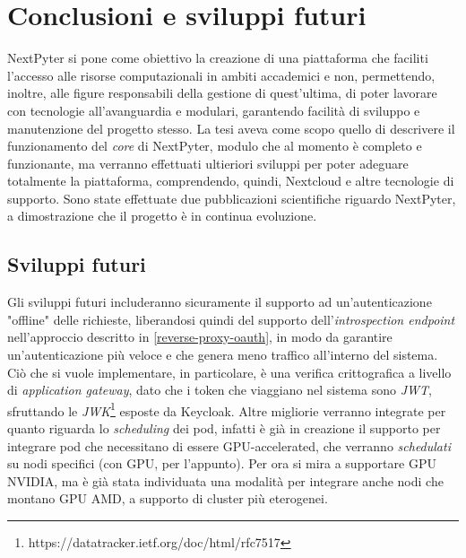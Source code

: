 \chapter{Conclusioni e sviluppi futuri}
NextPyter si pone come obiettivo la creazione di una piattaforma che faciliti l'accesso alle risorse computazionali in ambiti accademici e non, permettendo, inoltre, alle figure responsabili della gestione di quest'ultima, di poter lavorare con tecnologie all'avanguardia e modulari, garantendo facilità di sviluppo e manutenzione del progetto stesso.
\newline
La tesi aveva come scopo quello di descrivere il funzionamento del \textit{core} di NextPyter, modulo che al momento è completo e funzionante, ma verranno effettuati ultieriori sviluppi per poter adeguare totalmente la piattaforma, comprendendo, quindi, Nextcloud e altre tecnologie di supporto.
\newline
Sono state effettuate due pubblicazioni scientifiche\cite{nextpyter-work-1}\cite{nextpyter-work-2} riguardo NextPyter, a dimostrazione che il progetto è in continua evoluzione.

\section{Sviluppi futuri}
Gli sviluppi futuri includeranno sicuramente il supporto ad un'autenticazione "offline" delle richieste, liberandosi quindi del supporto dell'\textit{introspection endpoint} nell'approccio descritto in \ref{reverse-proxy-oauth}, in modo da garantire un'autenticazione più veloce e che genera meno traffico all'interno del sistema. Ciò che si vuole implementare, in particolare, è una verifica crittografica a livello di \textit{application gateway}, dato che i token che viaggiano nel sistema sono \textit{JWT}, sfruttando le \textit{JWK}\footnote{https://datatracker.ietf.org/doc/html/rfc7517} esposte da Keycloak.
\newline
Altre migliorie verranno integrate per quanto riguarda lo \textit{scheduling} dei pod, infatti è già in creazione il supporto per integrare pod che necessitano di essere GPU-accelerated, che verranno \textit{schedulati} su nodi specifici (con GPU, per l'appunto). Per ora si mira a supportare GPU NVIDIA, ma è già stata individuata una modalità per integrare anche nodi che montano GPU AMD, a supporto di cluster più eterogenei.